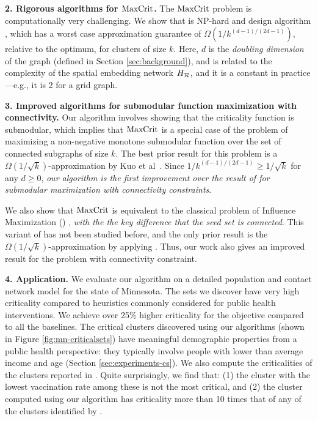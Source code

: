 \noindent
\textbf{2. Rigorous algorithms for $\text{MaxCrit}{}$.}
The $\text{MaxCrit}{}$ problem is computationally very challenging. We show that \maxcrit{} is NP-hard and design algorithm \algomaxcrit{}, which has a worst case approximation guarantee of $\Omega(1/k^{(d-1)/(2d-1)})$, relative to the optimum, for clusters of size $k$. Here, $d$ is the \emph{doubling dimension} of the graph (defined in Section \ref{sec:background}), and is related to the complexity of the spatial embedding network $H_{\mathcal{R}}$, and it is a constant in practice---e.g., it is 2 for a grid graph.

\noindent
\textbf{3. Improved algorithms for submodular function maximization with connectivity.}
Our algorithm involves showing that the criticality function is submodular, which implies that $\text{MaxCrit}{}$ is a special case
of the problem of maximizing a non-negative monotone submodular function over the set of connected subgraphs of size $k$.
The best prior result for this problem is a $\Omega(1/\sqrt{k})$-approximation by Kuo et al~\cite{kuo2015maximizing}.
Since $1/k^{(d-1)/(2d-1)}\geq 1/\sqrt{k}$ for any $d\geq0$, \emph{our algorithm is the first improvement over the
result of \cite{kuo2015maximizing} for submodular maximization with connectivity constraints}.

We also show that $\text{MaxCrit}{}$ is equivalent to the classical problem of Influence Maximization (\infmax) \cite{kempe:sigkdd03},
\emph{with the the key difference that the seed set is connected}. This variant of \infmax{} has not been studied before,
and the only prior result is the $\Omega(1/\sqrt{k})$-approximation by applying \cite{kuo2015maximizing}.
Thus, our work also gives an improved result for the \infmax{} problem with connectivity constraint.



\noindent
\textbf{4. Application.} 
We evaluate our algorithm on a detailed population and contact network model for the state of Minnesota.
The sets we discover have very high criticality compared to
heuristics commonly considered for public health interventions.
We achieve over 25\% higher criticality for the objective compared to all the baselines.
The critical clusters discovered using our algorithms (shown in Figure \ref{fig:mn-criticalsets})
have meaningful demographic properties
from a public health perspective: they typically involve people with lower than average
income and age (Section \ref{sec:experiments-cs}).
We also compute the criticalities of the clusters reported in \cite{cadena:vacc-cluster}.
Quite surprisingly, we find that: (1) the cluster with the lowest vaccination rate among these is not the most critical, and
(2) the cluster computed using our algorithm has criticality more than 10 times that of any of the clusters
identified by \cite{cadena:vacc-cluster}.


